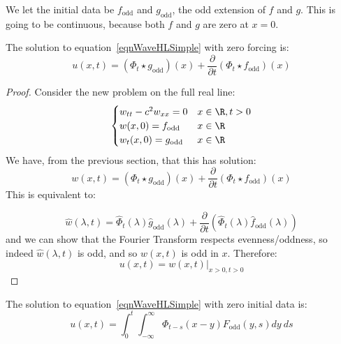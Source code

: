 \documentclass[../Main.tex]{subfiles}
\begin{document}
We let the initial data be $f_{\text{odd}}$ and $g_{\text{odd}}$, the odd extension of $f$ and $g$. This is going to be continuous, because both $f$ and $g$ are zero at $x = 0$.
\begin{proposition}
    The solution to equation~\ref{eqnWaveHLSimple} with zero forcing is:
    \begin{equation}
        u(x, t) = \left(\Phi_t \star g_{\text{odd}}\right)(x) + \frac{\partial}{\partial t} \left(\Phi_t \star f_{\text{odd}}\right)(x)
        \label{eqnWaveHLZeroForce}
    \end{equation}
    \label{propWaveHLZeroForce}
\end{proposition}
\begin{proof}
    Consider the new problem on the full real line:
    \begin{equation*}
        \begin{cases}
            w_{tt} - c^2 w_{xx} = 0 & x \in \R, t > 0 \\
            w(x, 0) = f_{\text{odd}} & x \in \R \\
            w_t(x, 0) = g_{\text{odd}} & x \in \R
        \end{cases}
    \end{equation*}
    We have, from the previous section, that this has solution:
    \begin{equation*}
        w(x, t) = \left(\Phi_t \star g_{\text{odd}}\right)(x) + \frac{\partial}{\partial t} \left(\Phi_t \star f_{\text{odd}}\right)(x)
    \end{equation*}
    This is equivalent to:

    \begin{equation*}
        \hat{w}(\lambda, t) = \hat{\Phi}_t(\lambda) \hat{g}_{\text{odd}}(\lambda) + \frac{\partial}{\partial t} \left(\hat{\Phi}_t(\lambda) \hat{f}_{\text{odd}}(\lambda)\right)
    \end{equation*}
    and we can show that the Fourier Transform respects evenness/oddness, so indeed $\hat{w}(\lambda, t)$ is odd, and so $w(x,t)$ is odd in $x$. Therefore:
    \begin{equation*}
        u(x, t) = w(x, t) |_{x > 0, t > 0}
    \end{equation*}
\end{proof}
\begin{proposition}
    The solution to equation~\ref{eqnWaveHLSimple} with zero initial data is:
    \begin{equation*}
        u(x, t) = \int_{0}^{t} \int_{-\infty}^{\infty} \Phi_{t - s}(x - y) F_{\text{odd}}(y,s) dy~ds 
    \end{equation*}
    \label{propWaveHLZeroInit}
\end{proposition}
\end{document}
